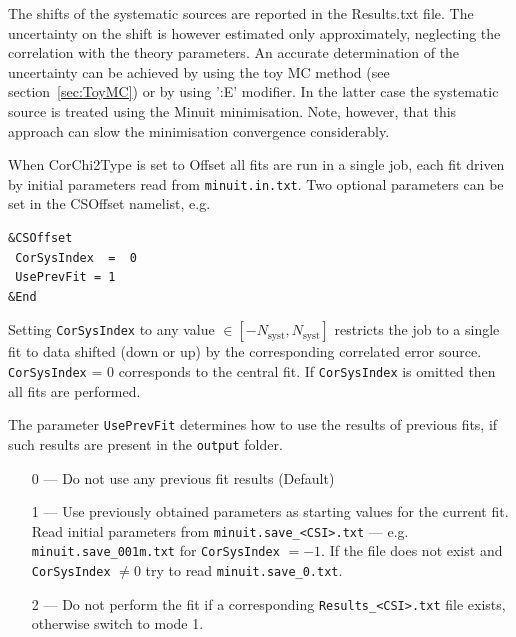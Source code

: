 The shifts of the systematic sources are reported in the {\sc Results.txt} file. The uncertainty on the shift
is however estimated only approximately, neglecting the correlation with the theory parameters. An accurate determination
of the uncertainty can be achieved by using the toy MC method (see section~\ref{sec:ToyMC}) or by using {\sc ':E'} 
modifier. In the latter case the systematic source is treated using the {\sc Minuit} minimisation. Note, however,
that this approach can slow the minimisation convergence considerably.


When {\sc CorChi2Type} is set to {\sc Offset}
all fits are run in a single job, each fit driven by initial parameters read from \verb'minuit.in.txt'.
Two optional parameters can be set in the {\sc CSOffset} namelist, e.g.
\begin{verbatim}
&CSOffset
 CorSysIndex  =  0
 UsePrevFit = 1
&End
\end{verbatim}
\vspace*{-1ex}
Setting \verb'CorSysIndex' to any value $\in [-N_\mathrm{syst}, N_\mathrm{syst}]$ 
restricts the job to a single fit to data shifted (down or up) by the corresponding correlated error source.
\verb'CorSysIndex' = 0 corresponds to the central fit.
If \verb'CorSysIndex' is omitted then all fits are performed.

The parameter {\tt UsePrevFit} determines how to use the results of previous fits,
if such results are present in the \verb'output' folder.
\begin{enumerate}
\item [0 ---]
Do not use any previous fit results (Default)
\item [1 ---]
Use previously obtained parameters as starting values for the current fit.
Read initial parameters from \verb'minuit.save_<CSI>.txt'
 --- e.g.  \verb'minuit.save_001m.txt' for \verb'CorSysIndex' $= -1$.
If the file does not exist and \verb'CorSysIndex' $\neq 0$ try to read
\verb'minuit.save_0.txt'.
\item [2 ---]
Do not perform the fit if a corresponding \verb'Results_<CSI>.txt' file exists,
otherwise switch to mode 1.
\end{enumerate}

